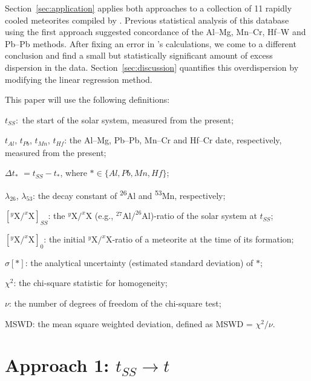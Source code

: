 \documentclass{article}
\begin{document}
Section~\ref{sec:application} applies both approaches to a collection
of 11 rapidly cooled meteorites compiled by
\citet{desch2023a,desch2023b}. Previous statistical analysis of this
database using the first approach suggested concordance of the
Al--Mg, Mn--Cr, Hf--W and Pb--Pb methods. After
fixing an error in \citet{desch2023a,desch2023b}'s calculations,
we come to a different conclusion and find a small but statistically
significant amount of excess dispersion in the data.
Section~\ref{sec:discussion} quantifies this overdispersion
by modifying the linear regression method.\medskip

This paper will use the following definitions:

\begin{description}
\item{$t_{\mathit{SS}}:$} the start of the solar system, measured from the present;
\item{$t_{\mathit{Al}}$, $t_{\mathit{Pb}}$, $t_{\mathit{Mn}}$, $t_{\mathit{Hf}}$:} the Al--Mg, Pb--Pb,
  Mn--Cr and Hf--Cr date, respectively, measured from the present;
\item{$\Delta t_{\ast}$} $= t_{\mathit{SS}} - t_{\ast}$, where $\ast
  \in \{\mathit{Al}, \mathit{Pb}, \mathit{Mn}, \mathit{Hf}\}$;
\item{$\lambda_{26}$, $\lambda_{53}$:} the decay constant of
  \textsuperscript{26}Al and \textsuperscript{53}Mn, respectively;
\item{$\left[{}^{y}\mbox{X}/^{x}\mbox{X}\right]_{\mathit{SS}}$:} the
  ${}^{y}\mbox{X}/^{x}\mbox{X}$ (e.g.,
  ${}^{27}\mbox{Al}/^{26}\mbox{Al}$)-ratio of the solar system at
  $t_{\mathit{SS}}$;
\item{$\left[{}^{y}\mbox{X}/^{x}\mbox{X}\right]_{0}$:} the initial
  ${}^{y}\mbox{X}/^{x}\mbox{X}$-ratio of a meteorite at the time
  of its formation;
\item{$\sigma[\ast]$:} the analytical uncertainty (estimated standard
  deviation) of $\ast$;
\item{$\chi^2$:} the chi-square statistic for homogeneity;
\item{$\nu$:} the number of degrees of freedom of the chi-square test;
\item{MSWD:} the mean square weighted deviation, defined as MSWD =
  $\chi^2/\nu$.
\end{description}

\section{Approach 1: $t_{\mathit{SS}} \rightarrow t$}
\label{sec:means}
\end{document}
